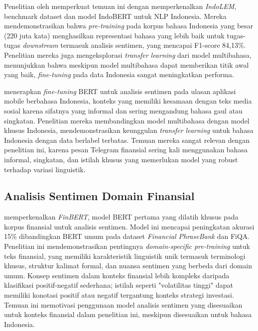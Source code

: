 Penelitian oleh \textcite{koto2020} memperkuat temuan ini dengan memperkenalkan \textit{IndoLEM}, benchmark dataset dan model IndoBERT untuk NLP Indonesia. Mereka mendemonstrasikan bahwa \textit{pre-training} pada korpus bahasa Indonesia yang besar (220 juta kata) menghasilkan representasi bahasa yang lebih baik untuk tugas-tugas \textit{downstream} termasuk analisis sentimen, yang mencapai F1-score 84,13\%. Penelitian mereka juga mengeksplorasi \textit{transfer learning} dari model multibahasa, menunjukkan bahwa meskipun model multibahasa dapat memberikan titik awal yang baik, \textit{fine-tuning} pada data Indonesia sangat meningkatkan performa.

\textcite{nugroho2021} menerapkan \textit{fine-tuning} BERT untuk analisis sentimen pada ulasan aplikasi mobile berbahasa Indonesia, konteks yang memiliki kesamaan dengan teks media sosial karena sifatnya yang informal dan sering mengandung bahasa gaul atau singkatan. Penelitian mereka membandingkan model multibahasa dengan model khusus Indonesia, mendemonstrasikan keunggulan \textit{transfer learning} untuk bahasa Indonesia dengan data berlabel terbatas. Temuan mereka sangat relevan dengan penelitian ini, karena pesan Telegram finansial sering kali menggunakan bahasa informal, singkatan, dan istilah khusus yang memerlukan model yang robust terhadap variasi linguistik.

\subsection{Analisis Sentimen Domain Finansial}

\textcite{araci2019} memperkenalkan \textit{FinBERT}, model BERT pertama yang dilatih khusus pada korpus finansial untuk analisis sentimen. Model ini mencapai peningkatan akurasi 15\% dibandingkan BERT umum pada dataset \textit{Financial PhraseBank} dan FiQA. Penelitian ini mendemonstrasikan pentingnya \textit{domain-specific pre-training} untuk teks finansial, yang memiliki karakteristik linguistik unik termasuk terminologi khusus, struktur kalimat formal, dan nuansa sentimen yang berbeda dari domain umum. Konsep sentimen dalam konteks finansial lebih kompleks daripada klasifikasi positif-negatif sederhana; istilah seperti "volatilitas tinggi" dapat memiliki konotasi positif atau negatif tergantung konteks strategi investasi. Temuan ini memotivasi penggunaan model analisis sentimen yang disesuaikan untuk konteks finansial dalam penelitian ini, meskipun disesuaikan untuk bahasa Indonesia.

